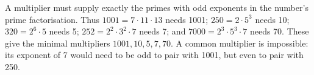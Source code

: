 A multiplier must supply exactly the primes with odd exponents in the number's prime factorisation. Thus $1001=7\cdot11\cdot13$ needs 1001; $250=2\cdot5^3$ needs 10; $320=2^6\cdot5$ needs 5; $252=2^2\cdot3^2\cdot7$ needs 7; and $7000=2^3\cdot5^3\cdot7$ needs 70. These give the minimal multipliers $\boxed{1001,10,5,7,70}$. A common multiplier is impossible: its exponent of 7 would need to be odd to pair with 1001, but even to pair with 250.

